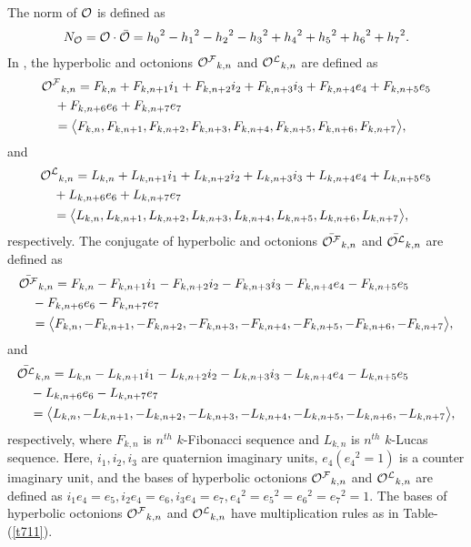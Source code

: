 The norm of ${{\mathcal{O}}}$ is defined as
\begin{align*}
N_{{{\mathcal{O}}}}={{\mathcal{O}}}\cdot\bar{{{\mathcal{O}}}}={h_0}^2-{h_1}^2-{h_2}^2-{h_3}^2+{h_4}^2+{h_5}^2+{h_6}^2+{h_7}^2.
\end{align*}
In \cite{1}, the hyperbolic \kF\vspace{0mm} and \kL\vspace{0mm} octonions ${{\mathcal{O^F}}}_{k,n}$ and ${{\mathcal{O^L}}}_{k,n}$ are defined as 
\begin{align*} 
&{{\mathcal{O^F}}}_{k,n}=F_{k,n}+F_{k,n+1}i_1+F_{k,n+2}i_2+F_{k,n+3}i_3+F_{k,n+4}e_4+F_{k,n+5}e_5\\&\quad +F_{k,n+6}e_6+F_{k,n+7}e_7\\
&\quad =\big\langle F_{k,n}, F_{k,n+1}, F_{k,n+2}, F_{k,n+3}, F_{k,n+4}, F_{k,n+5}, F_{k,n+6}, F_{k,n+7}\big\rangle,
\end{align*}
and
\begin{align*}
&{{\mathcal{O^L}}}_{k,n}=L_{k,n}+L_{k,n+1}i_1+L_{k,n+2}i_2+L_{k,n+3}i_3+L_{k,n+4}e_4+L_{k,n+5}e_5\\&\quad +L_{k,n+6}e_6+L_{k,n+7}e_7\\
&\quad =\big\langle L_{k,n}, L_{k,n+1}, L_{k,n+2}, L_{k,n+3}, L_{k,n+4}, L_{k,n+5}, L_{k,n+6}, L_{k,n+7}\big\rangle,
\end{align*}
respectively. The conjugate of hyperbolic \kF\vspace{0mm} and \kL\vspace{0mm} octonions $\bar{{{\mathcal{O^F}}}}_{k,n}$ and $\bar{{{\mathcal{O^L}}}}_{k,n}$ are defined as 
\begin{align*} 
&\bar{{{\mathcal{O^F}}}}_{k,n}=F_{k,n}-F_{k,n+1}i_1-F_{k,n+2}i_2-F_{k,n+3}i_3-F_{k,n+4}e_4-F_{k,n+5}e_5\\&\quad -F_{k,n+6}e_6-F_{k,n+7}e_7\\
&\quad =\big\langle F_{k,n}, -F_{k,n+1}, -F_{k,n+2}, -F_{k,n+3}, -F_{k,n+4}, -F_{k,n+5}, -F_{k,n+6}, -F_{k,n+7}\big\rangle,
\end{align*}
and
\begin{align*}
&\bar{{{\mathcal{O^L}}}}_{k,n}=L_{k,n}-L_{k,n+1}i_1-L_{k,n+2}i_2-L_{k,n+3}i_3-L_{k,n+4}e_4-L_{k,n+5}e_5\\&\quad -L_{k,n+6}e_6-L_{k,n+7}e_7\\
&\quad =\big\langle L_{k,n}, -L_{k,n+1}, -L_{k,n+2}, -L_{k,n+3}, -L_{k,n+4}, -L_{k,n+5}, -L_{k,n+6}, -L_{k,n+7}\big\rangle,
\end{align*}
respectively, where $F_{k,n}$ is $n^{th}$ $k$-Fibonacci sequence and $L_{k,n}$ is $n^{th}$ $k$-Lucas sequence. Here, $i_1, i_2, i_3$ are quaternion imaginary units, $e_4 ({e_4}^2=1)$ is a counter imaginary unit, and the bases of hyperbolic octonions ${{\mathcal{O^F}}}_{k,n}$ and ${{\mathcal{O^L}}}_{k,n}$ are defined as $i_1e_4=e_5, i_2e_4=e_6,i_3e_4=e_7, {e_4}^2={e_5}^2={e_6}^2={e_7}^2=1$. The bases of hyperbolic octonions ${{\mathcal{O^F}}}_{k,n}$ and ${{\mathcal{O^L}}}_{k,n}$ have multiplication rules as in Table-(\ref{t711}).
